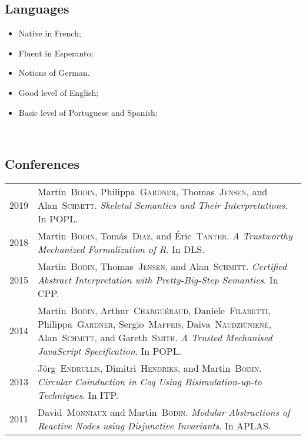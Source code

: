 \documentclass[12pt,a4paper]{article}
\makeatletter
\newenvironment{datecvsection}[1]%
               {\subsection*{#1}%
                 \noindent \begin{tabular}{@{}p{\annee}p{\texte}@{}}}
               {\end{tabular}}
\newenvironment{cvsection}[1]%
               {\subsection*{#1}}
               {}
\newcommand\familyName{\textsc}
\makeatother
\begin{document}
\begin{cvsection}{Languages}
\parbox{.4\textwidth}{
\begin{itemize}
   \item Native in French;
   \item Fluent in Esperanto;
   \item Notions of German.
\end{itemize}}
\parbox{.5\textwidth}{
\begin{itemize}
   \item Good level of English;
   \item Basic level of Portuguese and Spanish;
\end{itemize}
~\\}
\end{cvsection}

\begin{datecvsection}{Conferences}

  2019 & Martin~\familyName{Bodin}, Philippa~\familyName{Gardner}, Thomas~\familyName{Jensen}, and Alan~\familyName{Schmitt}. \textit{Skeletal Semantics and Their Interpretations}. In POPL. \\

  2018 & Martin~\familyName{Bodin}, Tomás~\familyName{Diaz}, and Éric~\familyName{Tanter}. \textit{A Trustworthy Mechanized Formalization of R}. In DLS. \\

  2015 & Martin~\familyName{Bodin}, Thomas~\familyName{Jensen}, and Alan~\familyName{Schmitt}. \textit{Certified Abstract Interpretation with Pretty-Big-Step Semantics}. In CPP. \\

  2014 & Martin~\familyName{Bodin}, Arthur~\familyName{Charguéraud}, Daniele~\familyName{Filaretti}, Philippa~\familyName{Gardner}, Sergio~\familyName{Maffeis}, Daiva~\familyName{Naudžiūnienė}, Alan~\familyName{Schmitt}, and Gareth~\familyName{Smith}. \textit{A Trusted Mechanised JavaScript Specification}. In POPL. \\

  2013 & Jörg~\familyName{Endrullis}, Dimitri~\familyName{Hendriks}, and Martin~\familyName{Bodin}. \textit{Circular Coinduction in Coq Using Bisimulation-up-to Techniques}. In ITP. \\

  2011 & David~\familyName{Monniaux} and Martin~\familyName{Bodin}. \textit{Modular Abstractions of Reactive Nodes using Disjunctive Invariants}. In APLAS. \\

\end{datecvsection}
\end{document}
